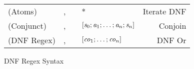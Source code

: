 \begin{figure}
\begin{tabular}{l@{\ }l@{\ }c@{\ }l@{\ }r}

(Atoms)& \Atom{},\AtomAlt{} & \GEq{} & \DNFRegex{}* & Iterate DNF\\
(Conjunct)& \Conjunct{},\ConjunctAlt{} & \GEq{} &
$[\mathit{s}_0;\mathit{a}_1;\ldots;\mathit{a}_n;\mathit{s}_n]$ & Conjoin\\
(DNF Regex)& \DNFRegex{},\DNFRegexAlt{} & \GEq{} & $[\mathit{co}_1;\ldots;\mathit{co}_n]$ & DNF Or\\
\end{tabular}
\caption{DNF Regex Syntax}
\label{fig:dnf-regex-syntax}
\end{figure}

